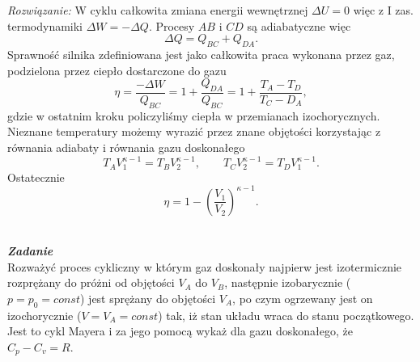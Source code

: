 \documentclass[11pt,a4paper]{article}
\newcounter{zadanie}\newcommand{\zadanie}[1][]{\addtocounter{zadanie}{1} ~\\  {\bf \emph{Zadanie \arabic{zadanie} #1 }} \\}
\begin{document}
{\em Rozwiązanie:}
W cyklu całkowita zmiana energii wewnętrznej $\Delta U = 0$ więc z I zas. termodynamiki $ \Delta W = - \Delta Q$. Procesy $AB$ i $CD$ są adiabatyczne więc
\begin{equation}
	\Delta Q = Q_{BC} + Q_{DA}.
\end{equation}
Sprawność silnika zdefiniowana jest jako całkowita praca wykonana przez gaz, podzielona przez ciepło dostarczone do gazu
\begin{equation}
	\eta = \frac{- \Delta W}{Q_{BC}} = 1 + \frac{Q_{DA}}{Q_{BC}} = 1 + \frac{T_A - T_D}{T_C - D_A},
\end{equation}
gdzie w ostatnim kroku policzyliśmy ciepła w przemianach izochorycznych. Nieznane temperatury możemy wyrazić przez znane objętości korzystając z równania adiabaty i równania gazu doskonałego
\begin{equation}
	T_A V_1^{\kappa-1} = T_B V_2^{\kappa - 1}, \qquad T_C V_2^{\kappa-1} = T_D V_1^{\kappa - 1}.
\end{equation}
Ostatecznie
\begin{equation}
	\eta = 1 - \left( \frac{V_1}{V_2} \right)^{\kappa - 1}.
\end{equation}

\newpage

\zadanie
Rozważyć proces cykliczny w którym gaz doskonały najpierw jest izotermicznie rozprężany 
do próżni od objętości $V_A$ do $V_B$, 
następnie izobarycznie ($p=p_0=const$) jest sprężany do objętości $V_A$, 
po czym ogrzewany jest on izochorycznie ($V=V_A=const$) tak, 
iż stan układu wraca do stanu początkowego. 
Jest to cykl Mayera i za jego pomocą wykaż dla gazu doskonałego, że $C_p-C_v=R$.\\
\end{document}
